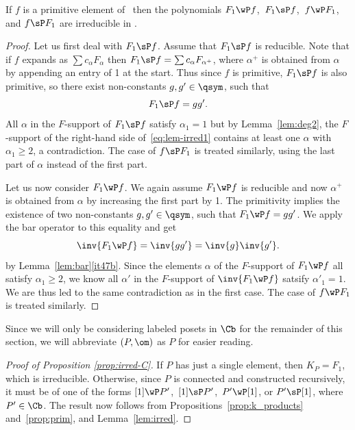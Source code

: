 \begin{lemma}\label{lem:irred}
If $f$ is a primitive element of \qsym\  then the polynomials
$F_1\wP f$,\ $F_1\sP f$,\ $f\wP F_1$, and $f\sP F_1$
are irreducible in \qsym.
\end{lemma}
\begin{proof}
Let us first deal with $F_1\sP f$.
Assume that $F_1\sP f$ is reducible. 
Note that if $f$ expands as $\sum c_\alpha F_\alpha$ then $F_1\sP f = \sum c_\alpha F_{\alpha^+}$, where $\alpha^+$ is obtained from $\alpha$ by appending an entry of 1 at the start.  Thus since $f$ is primitive, $F_1\sP f$ is also primitive, so there exist non-constants $g,g'\in \qsym$, such that 
\begin{equation}\label{eq:lem-irred1}
F_1\sP f = g g'.
\end{equation}
All $\alpha$ in the $F$-support of $F_1\sP f$ satisfy $\alpha_1=1$ but by Lemma~\ref{lem:deg2}, the $F$-support of the right-hand side of~\eqref{eq:lem-irred1} contains at least one $\alpha$ with $\alpha_1 \geq 2$, a contradiction.  The case of  $f\sP F_1$ is treated similarly, using the last part of $\alpha$ instead of the first part.

Let us now consider $F_1\wP f$.
We again assume $F_1\wP f$ is reducible and now $\alpha^+$ is obtained from $\alpha$ by increasing the first part by 1.  The primitivity 
implies the existence of two non-constants $g,g'\in \qsym$, 
such that $F_1\wP f = g g'$. We apply the bar operator to this equality
and get 
\[
\inv{F_1\wP f} = \inv{g g'} = \inv{g} \inv{g'}.
\]
by Lemma~\ref{lem:bar}\ref{it47b}. Since the elements $\alpha$ of the $F$-support of $F_1\wP f$ all satisfy $\alpha_1\ge 2$, we know all $\alpha'$ in the $F$-support of 
$\inv{F_1\wP f}$ satsify $\alpha'_1 = 1$.
We are thus led to the same contradiction as in the first case. 
The case of  $f\wP F_1$ is treated similarly.
\end{proof}

Since we will only be considering labeled posets in $\Cb$ for the remainder of this section, we will abbreviate $(P,\om)$ as $P$ for easier reading.

\begin{proof}[Proof of Proposition \ref{prop:irred-C}]
If $P$ has just a single element, then $K_P = F_1$, which is irreducible.  Otherwise, since $P$ is connected and constructed recursively, it must be of one of the forms $[1]\wP P'$,\ $[1]\sP P'$,\ 
$P'\wP [1]$, or $P'\sP [1]$, where $P' \in \Cb$.  The result now follows from Propositions~\ref{prop:k_products} and~\ref{prop:prim}, and Lemma~\ref{lem:irred}.
\end{proof}

